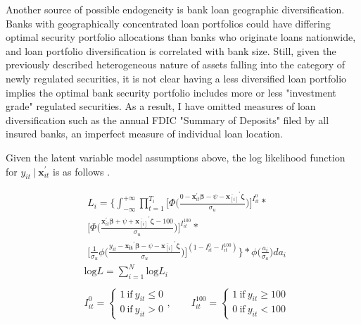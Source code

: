 \documentclass[preprint,12pt]{elsarticle}
\begin{document}
Another source of possible endogeneity is bank loan geographic diversification.  Banks with geographically concentrated loan portfolios could have differing optimal security portfolio allocations than banks who originate loans nationwide, and loan portfolio diversification is correlated with bank size.  Still, given the previously described heterogeneous nature of assets falling into the category of newly regulated securities, it is not clear having a less diversified loan portfolio implies the optimal bank security portfolio includes more or less "investment grade" regulated securities.  As a result, I have omitted measures of loan diversification such as the annual FDIC "Summary of Deposits" filed by all insured banks, an imperfect measure of individual loan location.  

Given the latent variable model assumptions above, the log likelihood function for $y_{it} \ | \ \bm{x}_{it}^{'}$ is as follows \citep{Bruno2004}. 

\begin{align*}
& L_{i} = \Bigg\{   \int_{-\infty}^{+\infty}  \prod_{t=1}^{T_{i}} \bigg[ \Phi \bigg( \frac{0 -\bm{x}_{it}^{'}\bm{\beta} - \psi - \overline{\bm{x}_{[i]}}^{'}\bm{\zeta}}{\sigma_{u}}\bigg)\bigg]^{I_{it}^{0}}* \\
&\bigg[ \Phi \bigg( \frac{\bm{x}_{it}^{'}\bm{\beta} +\psi + \overline{\bm{x}_{[i]}}^{'}\bm{\zeta} - 100} {\sigma_{u}} \bigg) \bigg] ^{I_{it}^{100}}* \\
& \bigg[ \frac{1}{\sigma_{u}}  \phi \bigg( \frac{y_{it} - \bm{x_{it}}^{'}\bm{\beta} - \psi - \overline{\bm{x}_{[i]}}^{'}\bm{\zeta}}{\sigma_{u}} \bigg) \bigg] ^{(1 - I_{it}^{0} - I_{it}^{100})} \Bigg\} * \phi \bigg( \frac{a_{i}}{\sigma_{a}} \bigg) da_{i} 
\end{align*}
\begin{align*}
&\textrm{log} L = \sum_{i=1}^{N} \textrm{log} L_{i} \\
&\\
& I_{it}^{0}=%
   \begin{cases}
     1 \ \textrm{if} \ y_{it} \leq0 \\
     0 \ \textrm{if} \ y_{it} > 0 
   \end{cases},
   \qquad 
   I_{it}^{100} =
   \begin{cases}
   	1 \ \textrm{if} \ y_{it} \geq100 \\ 
    0 \ \textrm{if} \ y_{it} < 100
   \end{cases} \\
   &
\end{align*}
\end{document}
